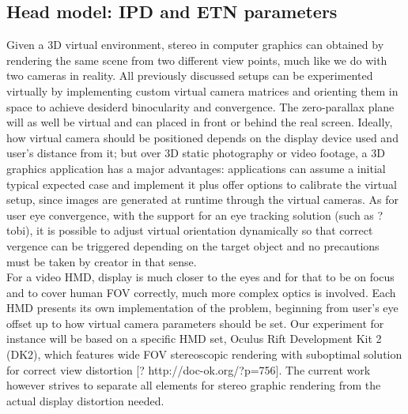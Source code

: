 \subsection{Head model: IPD and ETN parameters}
Given a 3D virtual environment, stereo in computer graphics can obtained by rendering the same scene from two different view points, much like we do with two cameras in reality. All previously discussed setups can be experimented virtually by implementing custom virtual camera matrices and orienting them in space to achieve desiderd binocularity and convergence. The zero-parallax plane will as well be virtual and can placed in front or behind the real screen. Ideally, how virtual camera should be positioned depends on the display device used and user’s distance from it; but over 3D static photography or video footage, a 3D graphics application has a major advantages: applications can assume a initial typical expected case and implement it plus offer options to calibrate the virtual setup, since images are generated at runtime through the virtual cameras. As for user eye convergence, with the support for an eye tracking solution (such as ?tobi), it is possible to adjust virtual orientation dynamically so that correct vergence can be triggered depending on the target object and no precautions must be taken by creator in that sense.\\
For a video HMD, display is much closer to the eyes and for that to be on focus and to cover human FOV correctly, much more complex optics is involved. Each HMD presents its own implementation of the problem, beginning from user’s eye offset up to how virtual camera parameters should be set. Our experiment for instance will be based on a specific HMD set, Oculus Rift Development Kit 2 (DK2), which features wide FOV stereoscopic rendering with suboptimal solution for correct view distortion [? http://doc-ok.org/?p=756]. The current work however strives to separate all elements for stereo graphic rendering from the actual display distortion needed.\\

